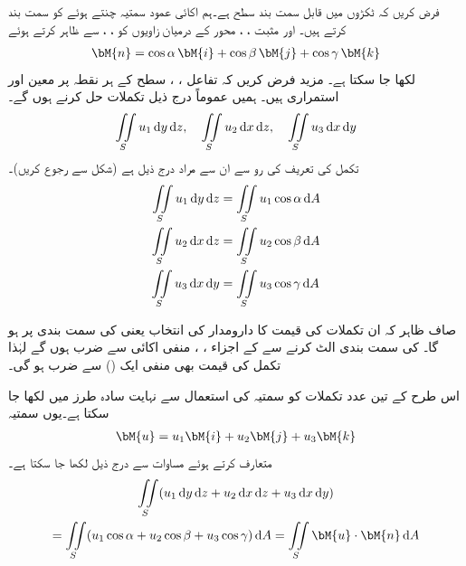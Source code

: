 فرض کریں کہ   ٹکڑوں میں قابل سمت بند سطح ہے۔ہم اکائی عمود سمتیہ  چنتے ہوئے  کو سمت بند کرتے ہیں۔  اور مثبت ، ، محور   کے درمیان زاویوں کو ، ،  سے ظاہر کرتے ہوئے
\begin{align}\label{مساوات_خطی_تکمل_اکائی_عمودی_ارکان}
\bM{n}=\cos \alpha \,\bM{i}+\cos \beta \,\bM{j}+\cos \gamma \, \bM{k}
\end{align}
لکھا جا سکتا ہے۔ مزید فرض کریں کہ تفاعل ، ،  سطح   کے ہر نقطہ  پر  معین اور استمراری ہیں۔ ہمیں عموماً درج ذیل تکملات حل کرنے ہوں گے۔
\begin{align*}
\iint\limits_S u_1\dif y\dif z,\quad \iint\limits_S u_2\dif x\dif z,\quad \iint\limits_S u_3\dif x\dif y
\end{align*}
تکمل کی تعریف کی رو سے  ان سے مراد درج ذیل ہے (شکل  سے رجوع کریں)۔
\begin{gather}
\begin{aligned}\label{مساوات_خطی_تکمل_تین_قسم_کے_تکمل_الف}
\iint\limits_S u_1\dif y\dif z&=\iint\limits_S u_1\cos \alpha \dif A\\
\iint\limits_S u_2\dif x\dif z&=\iint\limits_S u_2\cos \beta \dif A\\
\iint\limits_S u_3\dif x\dif y&=\iint\limits_S u_3\cos \gamma \dif A
\end{aligned}
\end{gather}

صاف ظاہر کہ ان تکملات کی قیمت کا دارومدار  کی انتخاب یعنی  کی سمت بندی پر ہو گا۔ کی سمت بندی الٹ کرنے سے  کے اجزاء ، ،  منفی اکائی سے ضرب ہوں گے لہٰذا  تکمل کی قیمت بھی منفی ایک () سے ضرب ہو گی۔

اس طرح کے تین عدد تکملات کو سمتیہ کی استعمال سے نہایت سادہ طرز میں لکھا جا سکتا ہے۔یوں سمتیہ
\begin{align*}
\bM{u}=u_1\bM{i}+u_2\bM{j}+u_3\bM{k}
\end{align*}
متعارف کرتے ہوئے  مساوات  سے درج ذیل لکھا جا سکتا ہے۔
\begin{multline}\label{مساوات_خطی_تکمل_عمودی_سمتیہ_اجزاء_استعمال}
\iint\limits_S (u_1\dif y\dif z+u_2\dif x\dif z+u_3\dif x\dif y)\\
=\iint\limits_S (u_1\cos \alpha +u_2\cos \beta+u_3\cos \gamma)\dif A=\iint\limits_S \bM{u}\cdot \bM{n}\dif A
\end{multline}

